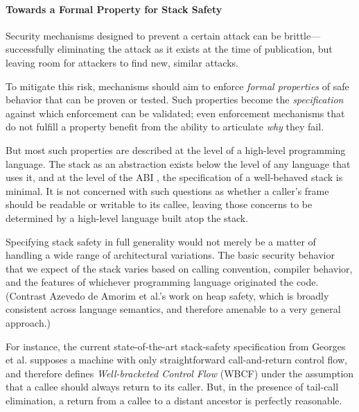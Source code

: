 \paragraph{Towards a Formal Property for Stack Safety}

Security mechanisms designed to prevent a certain attack can be brittle---successfully
eliminating the attack as it exists at the time of publication, but leaving room for attackers
to find new, similar attacks.

To mitigate this risk, mechanisms should aim to enforce \emph{formal properties}
of safe behavior that can be proven or tested. Such properties become the
\emph{specification} against which enforcement can be validated; even enforcement mechanisms that do
not fulfill a property benefit from the ability to articulate \emph{why} they fail.

But most such properties are described at the level of a high-level programming language.
The stack as an abstraction exists below the level of
any language that uses it, and at the level of the ABI
, the specification of a well-behaved
stack is minimal. It is not concerned with such questions as whether a caller's
frame should be readable or writable to its callee, leaving those concerns
to be determined by a high-level language built atop the stack.

Specifying stack safety in full generality would not merely be a matter of handling
a wide range of architectural variations. The basic security behavior that we expect
of the stack varies based on calling convention, compiler behavior, and the features of
whichever programming language originated the code.
(Contrast Azevedo de Amorim et al.'s \cite{DBLP:conf/post/AmorimHP18} work on heap safety,
which is broadly consistent across language semantics, and therefore
amenable to a very general approach.)

For instance, the current state-of-the-art stack-safety specification from Georges et al.
\cite{Georges22:TempsDesCerises} supposes a machine with only straightforward call-and-return
control flow, and therefore defines {\it Well-bracketed Control Flow} (WBCF) under the assumption that
a callee should always return to its caller. But, in the presence of tail-call elimination, a
return from a callee to a distant ancestor is perfectly reasonable.

